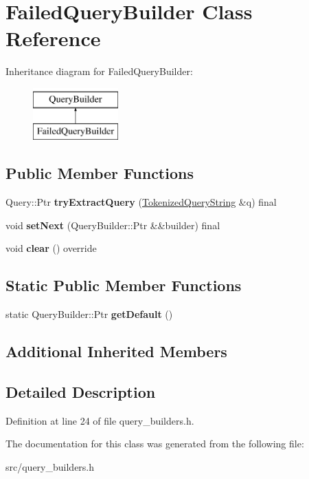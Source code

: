 \hypertarget{class_failed_query_builder}{}\section{Failed\+Query\+Builder Class Reference}
\label{class_failed_query_builder}
Inheritance diagram for Failed\+Query\+Builder\+:\begin{figure}[H]
\begin{center}
\leavevmode
\includegraphics[height=2.000000cm]{class_failed_query_builder}
\end{center}
\end{figure}
\subsection*{Public Member Functions}
\begin{DoxyCompactItemize}
\item 
\mbox{\label{class_failed_query_builder_a3f6d775ce553c92eb1c12fe87e90f60e}} 
Query\+::\+Ptr {\bfseries try\+Extract\+Query} (\hyperlink{struct_tokenized_query_string}{Tokenized\+Query\+String} \&q) final
\item 
\mbox{\label{class_failed_query_builder_add3120fe7949f737a6c833db1dcd34d8}} 
void {\bfseries set\+Next} (Query\+Builder\+::\+Ptr \&\&builder) final
\item 
\mbox{\label{class_failed_query_builder_acfb81aa5e49f10869aca93a47d175c23}} 
void {\bfseries clear} () override
\end{DoxyCompactItemize}
\subsection*{Static Public Member Functions}
\begin{DoxyCompactItemize}
\item 
\mbox{\label{class_failed_query_builder_a8f37cc4b7fd48f5c6ee47063ea6faa00}} 
static Query\+Builder\+::\+Ptr {\bfseries get\+Default} ()
\end{DoxyCompactItemize}
\subsection*{Additional Inherited Members}


\subsection{Detailed Description}


Definition at line 24 of file query\+\_\+builders.\+h.



The documentation for this class was generated from the following file\+:\begin{DoxyCompactItemize}
\item 
src/query\+\_\+builders.\+h\end{DoxyCompactItemize}
